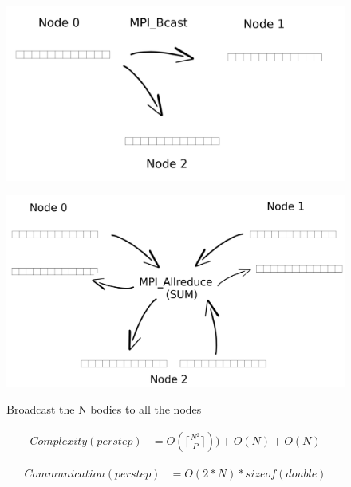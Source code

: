 \documentclass[a4paper]{article}
\begin{document}
\begin{figure}[ht]
\centering
\begin{minipage}{.5\textwidth}
  \centering
  \includegraphics[width=\linewidth]{broadcast2}
  \caption{Broadcast the N bodies to all the nodes}
  \label{fig:A2}
\end{minipage}%
\begin{minipage}{.5\textwidth}
  \centering
  \includegraphics[width=\linewidth]{MPI_all_reduce}
  \label{fig:C2}
\end{minipage}
\end{figure}
\FloatBarrier

\begin{equation} \label{eq:comp_app1}
\begin{split}
Complexity (per step) & = O(\lceil\frac{N^2}{P}\rceil)) + O(N) + O(N)
\end{split}
\end{equation}

\begin{equation} \label{eq:com_app1}
\begin{split}
Communication (per step) & = O(2*N)*sizeof(double)
\end{split}
\end{equation}
\end{document}
